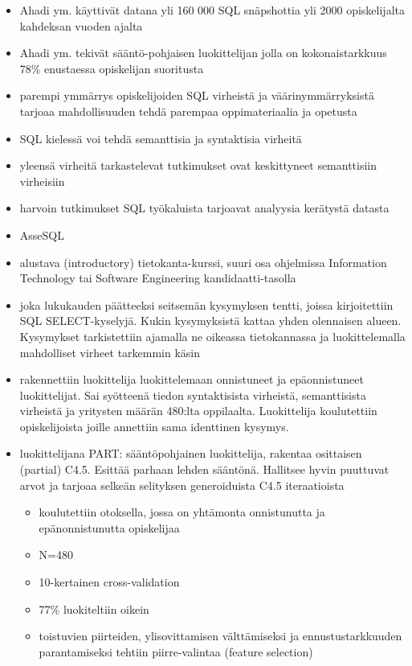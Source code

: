 \begin{itemize}
    \item Ahadi ym. \cite{Ahadi:2016:SSM:2839509.2844640}  käyttivät datana yli 160 000 SQL snäpshottia yli 2000 opiskelijalta kahdeksan vuoden ajalta
    \item Ahadi ym. \cite{Ahadi:2016:SSM:2839509.2844640} tekivät sääntö-pohjaisen luokittelijan jolla on kokonaistarkkuus 78\% enustaessa opiskelijan suoritusta
    \item parempi ymmärrys opiskelijoiden SQL virheistä ja väärinymmärryksistä tarjoaa mahdollisuuden tehdä parempaa oppimateriaalia ja opetusta
    \item SQL kielessä voi tehdä semanttisia ja syntaktisia virheitä
    \item yleensä virheitä tarkastelevat tutkimukset ovat keskittyneet semanttisiin virheisiin
    \item harvoin tutkimukset SQL työkaluista tarjoavat analyysia kerätystä datasta
    \item AsseSQL
    \item alustava (introductory) tietokanta-kurssi, suuri osa ohjelmissa Information Technology tai Software Engineering kandidaatti-tasolla
    \item joka lukukauden päätteeksi seitsemän kysymyksen tentti, joissa kirjoitettiin SQL SELECT-kyselyjä. Kukin kysymyksistä kattaa yhden olennaisen alueen. Kysymykset tarkistettiin ajamalla ne oikeassa tietokannassa ja luokittelemalla mahdolliset virheet tarkemmin käsin
    \item rakennettiin luokittelija luokittelemaan onnistuneet ja epäonnistuneet luokittelijat. Sai syötteenä tiedon syntaktisista virheistä, semanttisista virheistä ja yritysten määrän 480:lta oppilaalta. Luokittelija koulutettiin opiskelijoista joille annettiin sama identtinen kysymys.
    \item luokittelijana PART: sääntöpohjainen luokittelija, rakentaa osittaisen (partial) C4.5. Esittää parhaan lehden sääntönä. Hallitsee hyvin puuttuvat arvot ja tarjoaa selkeän selityksen generoiduista C4.5 iteraatioista
    \begin{itemize}
        \item koulutettiin otoksella, jossa on yhtämonta onnistunutta ja epänonnistunutta opiskelijaa
        \item N=480
        \item 10-kertainen cross-validation
        \item 77\% luokiteltiin oikein
        \item toistuvien piirteiden, ylisovittamisen välttämiseksi ja ennustustarkkuuden parantamiseksi tehtiin piirre-valintaa (feature selection)

\end{itemize}
\end{itemize}
